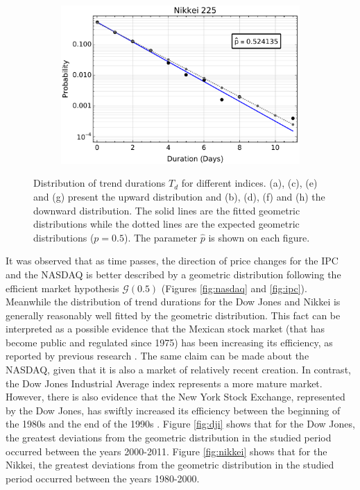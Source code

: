\documentclass[a4paper]{jpconf}
\begin{document}
\begin{figure}[h!tb]
\begin{subfigure}[b]{0.45\textwidth}
            \includegraphics[width=\textwidth]{img/dist_neg_Nikkei.pdf}
            \caption[]{}      
        \end{subfigure}
        \caption{\small Distribution of trend durations $T_d$ for different indices. (a), (c), (e) and (g) present the upward distribution and (b), (d), (f) and (h) the downward distribution. The solid lines are the fitted geometric distributions while the dotted lines are the expected geometric distributions ($p = 0.5$). The parameter $\hat{p}$ is shown on each figure.} 
	\label{fig:oneGT}
\end{figure}


It was observed that as time passes, the direction of price changes for the IPC and the NASDAQ is better described by a geometric distribution following the efficient market hypothesis $\mathcal{G}(0.5)$ (Figures \ref{fig:nasdaq} and \ref{fig:ipc}). Meanwhile the distribution of trend durations for the Dow Jones and Nikkei is generally reasonably well fitted by the geometric distribution. This fact can be interpreted as a possible evidence that the Mexican stock market (that has become public and regulated since 1975) has been increasing its efficiency, as reported by previous research \cite{Achach}. The same claim can be made about the NASDAQ, given that it is also a market of relatively recent creation. In contrast, the Dow Jones Industrial Average index represents a more mature market. However, there is also evidence that the New York Stock Exchange, represented by the Dow Jones, has swiftly increased its efficiency between the beginning of the 1980s and the end of the 1990s \cite{NYSE}. Figure \ref{fig:dji} shows that for the Dow Jones, the greatest deviations from the geometric distribution in the studied period occurred between the years 2000-2011. Figure \ref{fig:nikkei} shows that for the Nikkei, the greatest deviations from the geometric distribution in the studied period occurred between the years 1980-2000.
\end{document}
